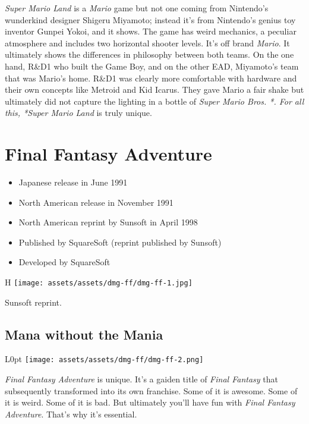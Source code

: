 \documentclass{book}
\begin{document}
\emph{Super Mario Land} is a \emph{Mario} game but not one coming from Nintendo’s wunderkind designer Shigeru Miyamoto; instead it’s from Nintendo’s genius toy inventor Gunpei Yokoi, and it shows. The game has weird mechanics, a peculiar atmosphere and includes two horizontal shooter levels. It’s off brand \emph{Mario}. It ultimately shows the differences in philosophy between both teams. On the one hand, R\&D1 who built the Game Boy, and on the other EAD, Miyamoto’s team that was Mario’s home. R\&D1 was clearly more comfortable with hardware and their own concepts like Metroid and Kid Icarus. They gave Mario a fair shake but ultimately did not capture the lighting in a bottle of \emph{Super Mario Bros. *. For all this, *Super Mario Land} is truly unique.


\begingroup \chapter*{Final Fantasy Adventure} \endgroup

\begin{itemize} \setlength\itemsep{-0.4em}
\item Japanese release in June 1991
\item North American release in November 1991
\item North American reprint by Sunsoft in April 1998
\item Published by SquareSoft (reprint published by Sunsoft)
\item Developed by SquareSoft
\end{itemize}\noindent

\begin{wrapfigure}{H}{\linewidth}
\vskip 4pt
\centering \texttt{[image: assets/assets/dmg-ff/dmg-ff-1.jpg]}\par{} Sunsoft reprint.\end{wrapfigure}
\clearpage

\FloatBarrier\needspace{5pt}\section*{Mana without the Mania}\nopagebreak[4]

\begin{wrapfigure}{L}{0pt} \texttt{[image: assets/assets/dmg-ff/dmg-ff-2.png]}\end{wrapfigure}
\emph{Final Fantasy Adventure} is unique. It’s a gaiden title of \emph{Final Fantasy} that subsequently transformed into its own franchise. Some of it is awesome. Some of it is weird. Some of it is bad. But ultimately you’ll have fun with \emph{Final Fantasy Adventure}. That’s why it’s essential.
\end{document}
